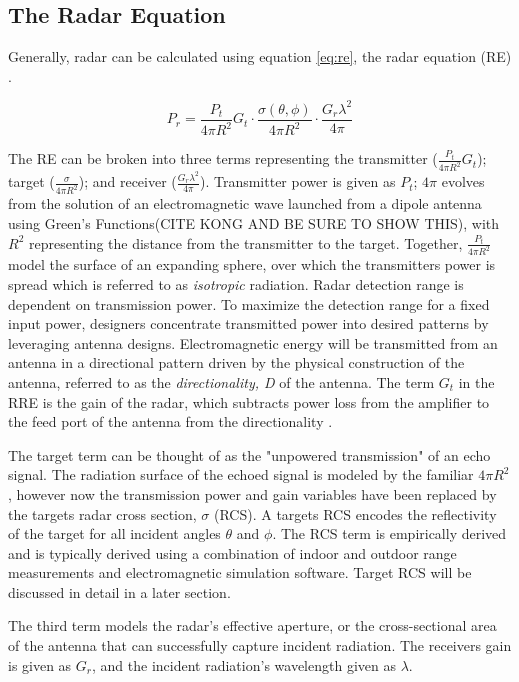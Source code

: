 \subsection{ The Radar Equation}

Generally, radar can be calculated using equation \ref{eq:re}, the radar equation (RE) \cite{POMR_Range_eq}.

\begin{equation}\label{eq:re}
	P_{r} = \frac{P_t}{4 \pi R^2}G_t \cdot \frac{\sigma(\theta, \phi)}{4 \pi R^2} \cdot \frac{G_r \lambda^2}{4 \pi}
\end{equation}

The RE can be broken into three terms representing the transmitter ($\frac{P_t }{4 \pi R^2}G_t$); target ($\frac{\sigma}{4 \pi R^2}$); and receiver ($\frac{G_r \lambda^2}{4 \pi}$). Transmitter power is given as $P_t$; $4 \pi$ evolves from the solution of an electromagnetic wave launched from a dipole antenna using Green's Functions(CITE KONG AND BE SURE TO SHOW THIS), with $ R^2$ representing the distance from the transmitter to the target. Together, $\frac{P_t}{4 \pi R^2}$ model the surface of an expanding sphere, over which the transmitters power is spread which is referred to as \textit{isotropic} radiation. Radar detection range is dependent on transmission power. To maximize the detection range for a fixed input power, designers concentrate transmitted power into desired patterns by leveraging antenna designs. Electromagnetic energy will be transmitted from an antenna in a directional pattern driven by the physical construction of the antenna, referred to as the \textit{directionality, D} of the antenna. The term $G_t$ in the RRE is the gain of the radar, which subtracts power loss from the amplifier to the feed port of the antenna from the directionality \cite{POMR_Range_eq}.

The target term can be thought of as the "unpowered transmission" of an echo signal. The radiation surface of the echoed signal is modeled by the familiar $4 \pi R^2$, however now the transmission power and gain variables have been replaced by the targets radar cross section, $\sigma$ (RCS). A targets RCS encodes the reflectivity of the target for all incident angles $\theta$ and $\phi$. The RCS term is empirically derived and is typically derived using a combination of indoor and outdoor range measurements and electromagnetic simulation software. Target RCS will be discussed in detail in a later section.

The third term models the radar's effective aperture, or the cross-sectional area of the antenna that can successfully capture incident radiation. The receivers gain is given as $G_r$, and the incident radiation's wavelength given as $\lambda$.

